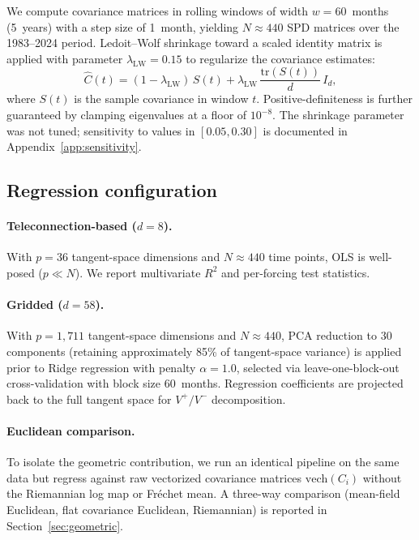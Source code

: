 \documentclass[preprint,12pt]{elsarticle}
\newcommand{\tr}{\mathrm{tr}}
\newcommand{\vech}{\mathrm{vech}}
\begin{document}
We compute covariance matrices in rolling windows of width $w = 60$~months (5~years) with a step size of 1~month, yielding $N \approx 440$ SPD matrices over the 1983--2024 period.
Ledoit--Wolf shrinkage toward a scaled identity matrix is applied with parameter $\lambda_\mathrm{LW} = 0.15$ to regularize the covariance estimates:
\begin{equation}
\hat{C}(t) = (1 - \lambda_\mathrm{LW})\, S(t) + \lambda_\mathrm{LW}\, \frac{\tr(S(t))}{d}\, I_d,
\end{equation}
where $S(t)$ is the sample covariance in window $t$.
Positive-definiteness is further guaranteed by clamping eigenvalues at a floor of $10^{-8}$.
The shrinkage parameter was not tuned; sensitivity to values in $[0.05, 0.30]$ is documented in Appendix~\ref{app:sensitivity}.

\subsection{Regression configuration}\label{sec:regconfig}

\paragraph{Teleconnection-based ($d=8$).}
With $p = 36$ tangent-space dimensions and $N \approx 440$ time points, OLS is well-posed ($p \ll N$).
We report multivariate $R^2$ and per-forcing test statistics.

\paragraph{Gridded ($d=58$).}
With $p = 1{,}711$ tangent-space dimensions and $N \approx 440$, PCA reduction to 30 components (retaining approximately 85\% of tangent-space variance) is applied prior to Ridge regression with penalty $\alpha = 1.0$, selected via leave-one-block-out cross-validation with block size 60~months.
Regression coefficients are projected back to the full tangent space for $V^+/V^-$ decomposition.

\paragraph{Euclidean comparison.}
To isolate the geometric contribution, we run an identical pipeline on the same data but regress against raw vectorized covariance matrices $\vech(C_i)$ without the Riemannian log map or Fr\'{e}chet mean.
A three-way comparison (mean-field Euclidean, flat covariance Euclidean, Riemannian) is reported in Section~\ref{sec:geometric}.
\end{document}
